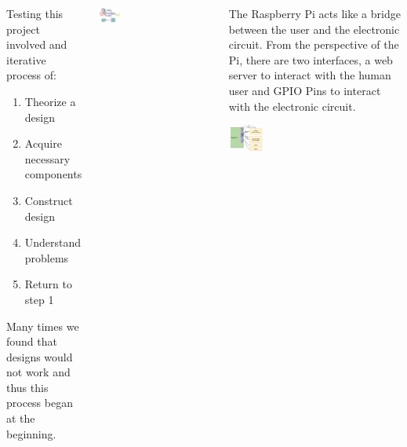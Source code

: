 \documentclass[25pt, a0paper, portrait, margin=0mm, innermargin=15mm, blockverticalspace=15mm, colspace=15mm, subcolspace=8mm]{tikzposter}
\begin{document}
\begin{columns}
{\begin{multicols}{2}
Testing this project involved
and iterative process of:
\begin{enumerate}
\item Theorize a design
\item Acquire necessary components
\item Construct design
\item Understand problems
\item Return to step 1
\end{enumerate}
Many times we found that designs would not work
and thus this process began at the beginning.

\end{multicols}
}



%
%
{
\begin{multicols}{2}

\begin{center}
\includegraphics[width=0.2\textwidth,keepaspectratio]{block_diagram.png}
\end{center}


\end{multicols}
}

%
%
{
\begin{multicols}{2}

The Raspberry Pi acts like a bridge between the user and the electronic circuit.
From the perspective of the Pi,
there are two interfaces,
a web server to interact with the human user and
GPIO Pins to interact with the electronic circuit.

\begin{center}
\includegraphics[width=0.2\textwidth,keepaspectratio]{rpi_connection.png}
\end{center}


\end{multicols}}
\end{columns}
\end{document}
